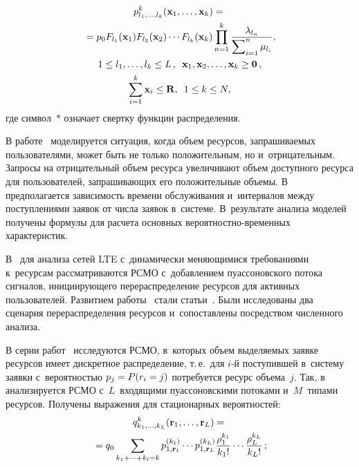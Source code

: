 \begin{multicols}{2}
\vspace*{-12pt}

\noindent
\begin{multline*}
p^k_{l_1,\ldots,l_k}(\mathbf{x}_1,\ldots,\mathbf{x}_k)={}\\
{}=p_0 
F_{l_1}(\mathbf{x}_1)F_{l_2}(\mathbf{x}_2)\cdots F_{l_k}(\mathbf{x}_k)
\displaystyle\prod\limits_{n=1}^{k}\displaystyle\frac{\displaystyle \lambda_{l_n}\mathstrut}{\displaystyle \sum\nolimits_{i=1}^{n}\mu_{l_i}\mathstrut},\\
1\leq l_1,\ldots,l_k \leq L\,, \enskip 
\mathbf{x}_1,\mathbf{x}_2,\ldots,\mathbf{x}_k\geq \mathbf{0}\,, \\
\displaystyle \sum\limits_{i=1}^{k}\mathbf{x}_i\leq \mathbf{R}, \enskip
1\leq k \leq N,
\end{multline*}
где символ~$*$ означает свертку функции распределения.

В работе~\cite{Naumov_15_2017} моделируется ситуация, когда объем ресурсов, 
запрашиваемых пользователями, может быть не только положительным, но 
и~отрицательным. Запросы на отрицательный объем ресурса увеличивают объем 
доступного ресурса для пользователей, запрашивающих его положительные объемы. 
В~\cite{Naumov_15_2017} предполагается зависимость времени обслуживания 
и~интервалов между поступлениями заявок от числа заявок в~системе. В~результате 
анализа моделей получены формулы для расчета основных 
ве\-ро\-ят\-но\-ст\-но-вре\-мен\-ных характеристик.

В~\cite{ Sopin_12_2017,Sopin_13_2017} для анализа сетей LTE с~динамически 
меняющимися требованиями к~ресурсам рас\-смат\-ри\-ва\-ют\-ся РСМО с~добавлением 
пуассоновского потока сигналов, инициирующего перераспределение ресурсов для 
активных пользователей. Развитием работы~\cite{Sopin_13_2017} 
стали статьи~\cite{Naumov_14_2017, Dohler_2017}.
Были исследованы два сценария перераспределения ресурсов и~сопоставлены 
посредством численного анализа.

В серии работ~\cite{Sopin_13_2017,Sopin_4_2015,Sopin_5_2015,Sopin_7_2016,Sopin_8_2017,Vihrova_
9_2017,Sopin_11_2017,Sopin_17_2018} исследуются РСМО, в~которых объем выделяемых 
заявке ресурсов имеет дискретное распределение, т.\,е.\ для $i$-й поступившей 
в~систему заявки с~вероятностью $p_j\hm=P(r_i\hm=j)$ потребуется ресурс объема~$j$.
Так, в~\cite{Sopin_7_2016} анализируется РСМО с~$L$~входящими пуассоновскими 
потоками и~$M$~типами ресурсов. Получены выражения для стационарных 
вероятностей:
\begin{multline*}
q^k_{k_1,\ldots,k_L}(\mathbf{r}_1,\ldots,\mathbf{r}_L)={}\\
{}=q_0
\sum\limits_{k_1+\cdots+k_l=k}p^{(k_1)}_{1,\mathbf{r}_1}\cdots p^{(k_L)}_{1,\mathbf{r}_L}
\displaystyle\frac{\displaystyle \rho_1^{k_1}\mathstrut}{\displaystyle k_1!\mathstrut}\cdots \displaystyle\frac{\displaystyle \rho_L^{k_L}\mathstrut}{\displaystyle k_L!\mathstrut}\,;
\end{multline*}


\end{multicols}
